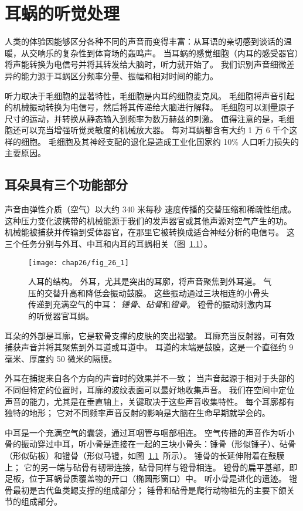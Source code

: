 \chapter{耳蜗的听觉处理} \label{chap:chap26}

人类的体验因能够区分各种不同的声音而变得丰富：从耳语的亲切感到谈话的温暖，从交响乐的复杂性到体育场的轰鸣声。
当耳蜗的感觉细胞（内耳的感受器官）将声能转换为电信号并将其转发给大脑时，听力就开始了。
我们识别声音细微差异的能力源于耳蜗区分频率分量、振幅和相对时间的能力。


听力取决于毛细胞的显著特性，毛细胞是内耳的细胞麦克风。
毛细胞将声音引起的机械振动转换为电信号，然后将其传递给大脑进行解释。
毛细胞可以测量原子尺寸的运动，并转换从静态输入到频率为数万赫兹的刺激。
值得注意的是，毛细胞还可以充当增强听觉灵敏度的机械放大器。
每对耳蜗都含有大约 1 万 6 千个这样的细胞。
毛细胞及其神经支配的退化是造成工业化国家约 10\% 人口听力损失的主要原因。



\section{耳朵具有三个功能部分}

声音由弹性介质（空气）以大约 340 米每秒 速度传播的交替压缩和稀疏性组成。
这种压力变化波携带的机械能源于我们的发声器官或其他声源对空气产生的功。
机械能被捕获并传输到受体器官，在那里它被转换成适合神经分析的电信号。
这三个任务分别与外耳、中耳和内耳的耳蜗相关（图~\ref{fig:26_1}）。


\begin{figure}[htbp]
	\centering
	\texttt{[image: chap26/fig\_26\_1]}
	\caption{人耳的结构。 
		外耳，尤其是突出的耳廓，将声音聚焦到外耳道。
		气压的交替升高和降低会振动鼓膜。
		这些振动通过三块相连的小骨头传递到充满空气的中耳：
		\textit{锤骨}、\textit{砧骨}和\textit{镫骨}。 
		镫骨的振动刺激内耳的听觉器官耳蜗。}
	\label{fig:26_1}
\end{figure}


耳朵的外部是耳廓，它是软骨支撑的皮肤的突出褶皱。
耳廓充当反射器，可有效捕获声音并将其聚焦到外耳道或耳道中。
耳道的末端是鼓膜，这是一个直径约 9 毫米、厚度约 50 微米的隔膜。


外耳在捕捉来自各个方向的声音时的效果并不一致；
当声音起源于相对于头部的不同但特定的位置时，耳廓的波纹表面可以最好地收集声音。
我们在空间中定位声音的能力，尤其是在垂直轴上，关键取决于这些声音收集特性。
每个耳廓都有独特的地形；
它对不同频率声音反射的影响是大脑在生命早期就学会的。


中耳是一个充满空气的囊袋，通过耳咽管与咽部相连。
空气传播的声音作为听小骨的振动穿过中耳，听小骨是连接在一起的三块小骨头：锤骨（形似锤子）、砧骨（形似砧板）和镫骨（形似马镫，如图~\ref{fig:26_1}~所示）。
锤骨的长延伸附着在鼓膜上；
它的另一端与砧骨有韧带连接，砧骨同样与镫骨相连。
镫骨的扁平基部，即足板，位于耳蜗骨质覆盖物的开口（椭圆形窗口）中。
听小骨是进化的遗迹。
镫骨最初是古代鱼类鳃支撑的组成部分；
锤骨和砧骨是爬行动物祖先的主要下颌关节的组成部分。


